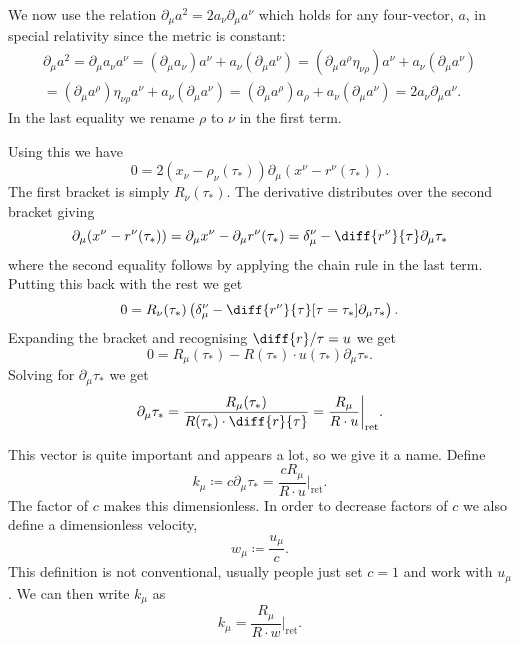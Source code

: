 \documentclass[fleqn]{NotesClass}
\newcommand*{\ret}{{\text{ret}}}
\begin{document}
    We now use the relation \(\partial_\mu a^2 = 2a_\nu \partial_\mu a^\nu\) which holds for any four-vector, \(a\), in special relativity since the metric is constant:
    \begin{multline}
        \partial_\mu a^2 = \partial_\mu a_\nu a^\nu = (\partial_\mu a_\nu)a^\nu + a_\nu (\partial_\mu a^\nu) = (\partial_\mu a^\rho \eta_{\nu\rho}) a^\nu + a_\nu (\partial_\mu a^\nu)\\
        = (\partial_\mu a^\rho)\eta_{\nu\rho}a^\nu + a_\nu (\partial_\mu a^\nu) = (\partial_\mu a^\rho)a_\rho + a_\nu (\partial_\mu a^\nu) = 2a_\nu \partial_\mu a^\nu.
    \end{multline}
    In the last equality we rename \(\rho\) to \(\nu\) in the first term.
    
    Using this we have
    \begin{equation}
        0 = 2(x_\nu - \rho_\nu(\tau_*)) \partial_\mu(x^\nu - r^\nu(\tau_*)).
    \end{equation}
    The first bracket is simply \(R_\nu(\tau_*)\).
    The derivative distributes over the second bracket giving
    \begin{equation}
        \partial_\mu(x^\nu - r^\nu(\tau_*)) = \partial_\mu x^\nu - \partial_\mu r^\nu(\tau_*) = \delta^\nu_\mu - \diff{r^\nu}{\tau} \partial_\mu \tau_*
    \end{equation}
    where the second equality follows by applying the chain rule in the last term.
    Putting this back with the rest we get
    \begin{equation}
        0 = R_\nu(\tau_*) \left( \delta_\mu^\nu - \diff{r^\nu}{\tau}[\tau = \tau_*] \partial_\mu \tau_* \right).
    \end{equation}
    Expanding the bracket and recognising \(\diff{r}/{\tau} = u\) we get
    \begin{equation}
        0 = R_\mu(\tau_*) - R(\tau_*) \cdot u(\tau_*) \partial_\mu \tau_*.
    \end{equation}
    Solving for \(\partial_\mu \tau_*\) we get
    \begin{equation}
        \partial_\mu \tau_* = \frac{R_\mu(\tau_*)}{R(\tau_*) \cdot \diff{r}{\tau}} = \frac{R_\mu}{R \cdot u} \bigg|_{\ret}.
    \end{equation}
    
    This vector is quite important and appears a lot, so we give it a name.
    Define
    \begin{equation}
        k_\mu \coloneqq c\partial_\mu \tau_* = \frac{cR_\mu}{R \cdot u} \bigg|_{\ret}.
    \end{equation}
    The factor of \(c\) makes this dimensionless.
    In order to decrease factors of \(c\) we also define a dimensionless velocity,
    \begin{equation}
        w_\mu \coloneq \frac{u_\mu}{c}.
    \end{equation}
    This definition is not conventional, usually people just set \(c = 1\) and work with \(u_\mu\).
    We can then write \(k_\mu\) as
    \begin{equation}
        k_\mu = \frac{R_\mu}{R \cdot w} \bigg|_{\ret}.
    \end{equation}
    
\end{document}
